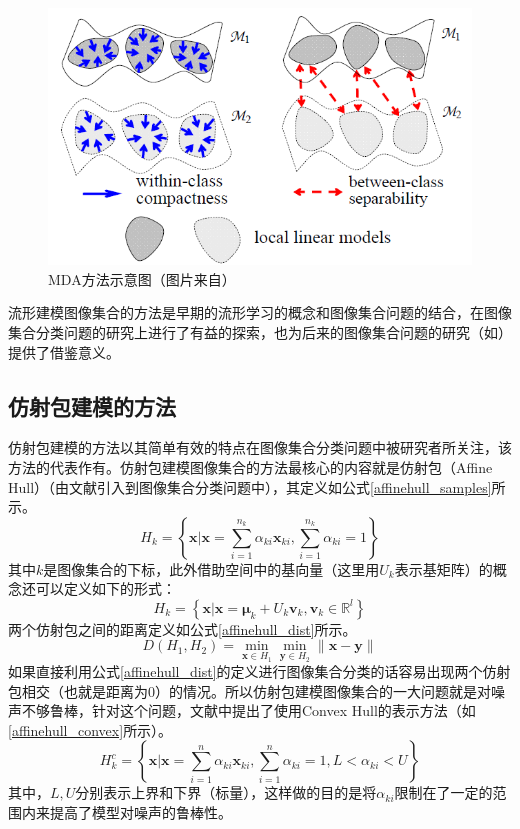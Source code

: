 \begin{figure}[h]
	\centering
	\includegraphics[width=0.7\linewidth]{source/MDA.png}
	\caption[MDA方法示意图]{MDA方法示意图（图片来自\cite{Manifold_MDA}）}
	\label{fig:MDA}
\end{figure}

流形建模图像集合的方法是早期的流形学习的概念和图像集合问题的结合，在图像集合分类问题的研究上进行了有益的探索，也为后来的图像集合问题的研究（如\cite{Statistics_DARG,Statistics_BeyondGauss}）提供了借鉴意义。
\subsection{仿射包建模的方法}
\label{sec:current_Affinehull}
仿射包建模的方法以其简单有效的特点在图像集合分类问题中被研究者所关注，该方法的代表作有\cite{Affinehull_AF,Affinehull_SANP,Affinehull_RNP,Affinehull_ProNN}。仿射包建模图像集合的方法最核心的内容就是仿射包（Affine Hull）（由文献\cite{Affinehull_AF}引入到图像集合分类问题中），其定义如公式\ref{affinehull_samples}所示。
\begin{equation}
\label{affinehull_samples}
H_k=\left\{\bm{x}|\bm{x}=\sum_{i=1}^{n_{k}} \alpha_{ki} \bm{x}_{ki},\sum_{i=1}^{n_{k}} \alpha_{ki} =1 \right\}
\end{equation}
其中$k$是图像集合的下标，此外借助空间中的基向量（这里用$U_k$表示基矩阵）的概念还可以定义如下的形式：
\begin{equation}
\label{affinehull_bases}
H_k=\left\{\bm{x}|\bm{x}=\bm{\mu}_k+U_k \bm{v}_k,\bm{v}_k \in \mathbb{R}^l\right\} 
\end{equation}
两个仿射包之间的距离定义如公式\ref{affinehull_dist}所示。
\begin{equation}
\label{affinehull_dist}
D(H_1,H_2)=\min_{\bm{x}\in H_1}\min_{\bm{y}\in H_2}\|\bm{x}-\bm{y}\| 
\end{equation}
如果直接利用公式\ref{affinehull_dist}的定义进行图像集合分类的话容易出现两个仿射包相交（也就是距离为0）的情况。所以仿射包建模图像集合的一大问题就是对噪声不够鲁棒，针对这个问题，文献\cite{Affinehull_AF}中提出了使用Convex Hull的表示方法（如\ref{affinehull_convex}所示）。
\begin{equation}
\label{affinehull_convex}
H_k^c=\left\{\bm{x}|\bm{x}=\sum_{i=1}^n \alpha_{ki} \bm{x}_{ki},\sum_{i=1}^n \alpha_{ki}=1,L< \alpha_{ki}<U\right\} 
\end{equation}
其中，$L,U$分别表示上界和下界（标量），这样做的目的是将$\alpha_{ki}$限制在了一定的范围内来提高了模型对噪声的鲁棒性。

